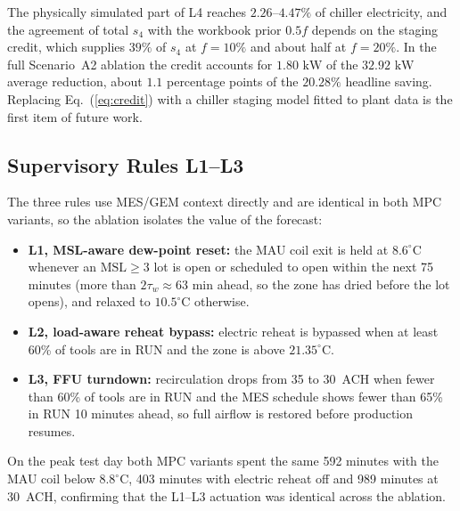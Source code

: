 The physically simulated part of L4 reaches $2.26$--$4.47\%$ of chiller electricity, and the agreement of total $s_4$ with the workbook prior $0.5f$ depends on the staging credit, which supplies $39\%$ of $s_4$ at $f = 10\%$ and about half at $f = 20\%$. In the full Scenario~A2 ablation the credit accounts for $1.80\text{ kW}$ of the $32.92\text{ kW}$ average reduction, about $1.1$ percentage points of the $20.28\%$ headline saving. Replacing Eq.~(\ref{eq:credit}) with a chiller staging model fitted to plant data is the first item of future work.

\subsection{Supervisory Rules L1--L3}

The three rules use MES/GEM context directly and are identical in both MPC variants, so the ablation isolates the value of the forecast:
\begin{itemize}
    \item \textbf{L1, MSL-aware dew-point reset:} the MAU coil exit is held at $8.6^\circ\text{C}$ whenever an $\text{MSL} \ge 3$ lot is open or scheduled to open within the next 75 minutes (more than $2\tau_w \approx 63\text{ min}$ ahead, so the zone has dried before the lot opens), and relaxed to $10.5^\circ\text{C}$ otherwise.
    \item \textbf{L2, load-aware reheat bypass:} electric reheat is bypassed when at least 60\% of tools are in RUN and the zone is above $21.35^\circ\text{C}$.
    \item \textbf{L3, FFU turndown:} recirculation drops from 35 to 30~ACH when fewer than 60\% of tools are in RUN and the MES schedule shows fewer than 65\% in RUN 10 minutes ahead, so full airflow is restored before production resumes.
\end{itemize}
On the peak test day both MPC variants spent the same 592 minutes with the MAU coil below $8.8^\circ\text{C}$, 403 minutes with electric reheat off and 989 minutes at 30~ACH, confirming that the L1--L3 actuation was identical across the ablation.


